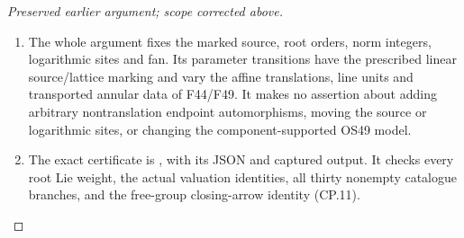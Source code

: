 \begin{proof}[Preserved earlier argument; scope corrected above]
\begin{enumerate}[label=\arabic*.]
\item The whole argument fixes the marked source, root orders, norm
integers, logarithmic sites and fan. Its parameter transitions have
the prescribed linear source/lattice marking and vary the affine
translations, line units and transported annular data of F44/F49.
It makes no assertion about adding arbitrary nontranslation endpoint
automorphisms, moving the source or logarithmic sites, or changing
the component-supported OS49 model.

\item The exact certificate is ,
with its JSON and captured output. It checks every root Lie weight,
the actual valuation identities, all thirty nonempty catalogue
branches, and the free-group closing-arrow identity (CP.11).

\end{enumerate}
\end{proof}